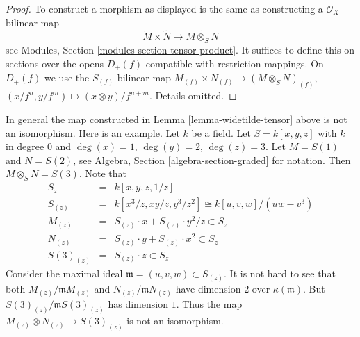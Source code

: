 \begin{proof}
To construct a morphism as displayed is the same as constructing
a $\mathcal{O}_X$-bilinear map
$$
\widetilde M \times \widetilde N
\longrightarrow
\widetilde{M \otimes_S N}
$$
see Modules, Section \ref{modules-section-tensor-product}.
It suffices to define this on sections over the opens $D_{+}(f)$
compatible with restriction mappings. On $D_{+}(f)$ we use the
$S_{(f)}$-bilinear map
$M_{(f)} \times N_{(f)} \to (M \otimes_S N)_{(f)}$,
$(x/f^n, y/f^m) \mapsto (x \otimes y)/f^{n + m}$. Details omitted.
\end{proof}

\begin{remark}
\label{remark-not-isomorphism}
In general the map constructed in Lemma \ref{lemma-widetilde-tensor}
above is not an isomorphism. Here is an example. Let $k$
be a field. Let $S = k[x, y, z]$ with $k$ in degree $0$ and
$\deg(x) = 1$, $\deg(y) = 2$, $\deg(z) = 3$.
Let $M = S(1)$ and $N = S(2)$, see
Algebra, Section \ref{algebra-section-graded}
for notation. Then $M \otimes_S N = S(3)$.
Note that
\begin{eqnarray*}
S_z
& = &
k[x, y, z, 1/z] \\
S_{(z)}
& = &
k[x^3/z, xy/z, y^3/z^2]
\cong
k[u, v, w]/(uw - v^3) \\
M_{(z)} & = & S_{(z)} \cdot x + S_{(z)} \cdot y^2/z \subset S_z \\
N_{(z)} & = & S_{(z)} \cdot y + S_{(z)} \cdot x^2 \subset S_z \\
S(3)_{(z)} & = & S_{(z)} \cdot z \subset S_z
\end{eqnarray*}
Consider the maximal ideal $\mathfrak m = (u, v, w) \subset S_{(z)}$.
It is not hard to see that both $M_{(z)}/\mathfrak mM_{(z)}$
and $N_{(z)}/\mathfrak mN_{(z)}$ have dimension $2$ over
$\kappa(\mathfrak m)$. But
$S(3)_{(z)}/\mathfrak mS(3)_{(z)}$ has dimension $1$.
Thus the map $M_{(z)} \otimes N_{(z)} \to S(3)_{(z)}$ is not
an isomorphism.
\end{remark}









